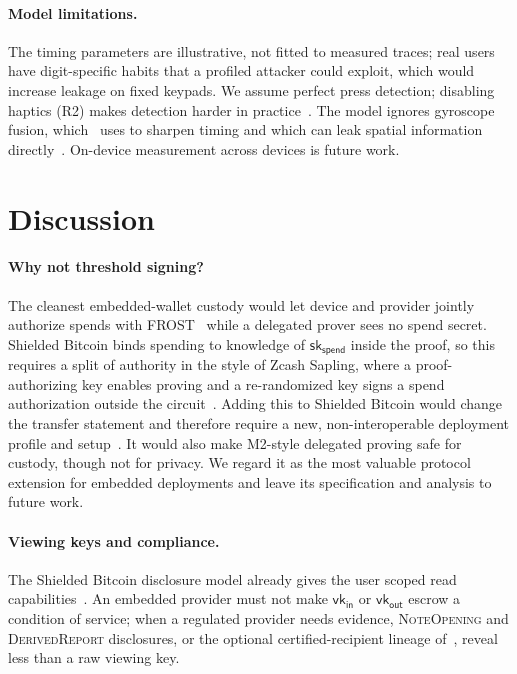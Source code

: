 \documentclass[11pt]{article}
\theoremstyle{remark}
\newcommand{\sk}{\mathsf{sk}}
\newcommand{\vk}{\mathsf{vk}}
\newcommand{\SB}{Shielded Bitcoin}
\begin{document}
\paragraph{Model limitations.} The timing parameters are illustrative, not fitted to measured traces; real users have digit-specific habits that a profiled attacker could exploit, which would increase leakage on fixed keypads. We assume perfect press detection; disabling haptics (R2) makes detection harder in practice~\cite{gn23}. The model ignores gyroscope fusion, which~\cite{gn23} uses to sharpen timing and which can leak spatial information directly~\cite{taplogger12,berend17}. On-device measurement across devices is future work.

\section{Discussion}
\label{sec:split}

\paragraph{Why not threshold signing?} The cleanest embedded-wallet custody would let device and provider jointly authorize spends with FROST~\cite{frost20} while a delegated prover sees no spend secret. \SB{} binds spending to knowledge of $\sk_{\mathsf{spend}}$ inside the proof, so this requires a split of authority in the style of Zcash Sapling, where a proof-authorizing key enables proving and a re-randomized key signs a spend authorization outside the circuit~\cite{zcash}. Adding this to \SB{} would change the transfer statement and therefore require a new, non-interoperable deployment profile and setup~\cite[App.~A]{sb26}. It would also make M2-style delegated proving safe for custody, though not for privacy. We regard it as the most valuable protocol extension for embedded deployments and leave its specification and analysis to future work.

\paragraph{Viewing keys and compliance.} The \SB{} disclosure model already gives the user scoped read capabilities~\cite[§7]{sb26}. An embedded provider must not make $\vk_{\mathsf{in}}$ or $\vk_{\mathsf{out}}$ escrow a condition of service; when a regulated provider needs evidence, \textsc{NoteOpening} and \textsc{DerivedReport} disclosures, or the optional certified-recipient lineage of~\cite[App.~D]{sb26}, reveal less than a raw viewing key.
\end{document}
